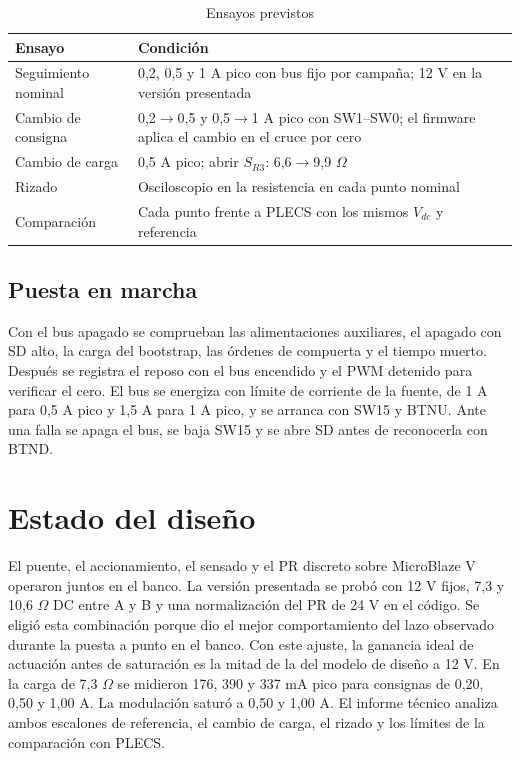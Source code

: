 \documentclass[conference]{IEEEtran}
\begin{document}
\begin{table}[H]\caption{Ensayos previstos}\centering\small
\begin{tabular}{@{}p{}p{}@{}}\toprule
Ensayo & Condición\\\midrule
Seguimiento nominal & 0,2, 0,5 y 1 A pico con bus fijo por campaña; 12 V en la versión presentada\\
Cambio de consigna & 0,2$\to$0,5 y 0,5$\to$1 A pico con SW1--SW0; el firmware aplica el cambio en el cruce por cero\\
Cambio de carga & 0,5 A pico; abrir $S_{R3}$: 6,6$\to$9,9 $\Omega$\\
Rizado & Osciloscopio en la resistencia en cada punto nominal\\
Comparación & Cada punto frente a PLECS con los mismos $V_{dc}$ y referencia\\\bottomrule
\end{tabular}\label{tab:ensayos}\end{table}

\subsection{Puesta en marcha}
Con el bus apagado se comprueban las alimentaciones auxiliares, el apagado con SD alto, la carga del bootstrap, las órdenes de compuerta y el tiempo muerto. Después se registra el reposo con el bus encendido y el PWM detenido para verificar el cero. El bus se energiza con límite de corriente de la fuente, de 1 A para 0,5 A pico y 1,5 A para 1 A pico, y se arranca con SW15 y BTNU. Ante una falla se apaga el bus, se baja SW15 y se abre SD antes de reconocerla con BTND.

\newpage
\section{Estado del diseño}
El puente, el accionamiento, el sensado y el PR discreto sobre MicroBlaze V operaron juntos en el banco. La versión presentada se probó con 12 V fijos, 7,3 y 10,6 $\Omega$ DC entre A y B y una normalización del PR de 24 V en el código. Se eligió esta combinación porque dio el mejor comportamiento del lazo observado durante la puesta a punto en el banco. Con este ajuste, la ganancia ideal de actuación antes de saturación es la mitad de la del modelo de diseño a 12 V. En la carga de 7,3 $\Omega$ se midieron 176, 390 y 337 mA pico para consignas de 0,20, 0,50 y 1,00 A. La modulación saturó a 0,50 y 1,00 A. El informe técnico analiza ambos escalones de referencia, el cambio de carga, el rizado y los límites de la comparación con PLECS.
\end{document}
